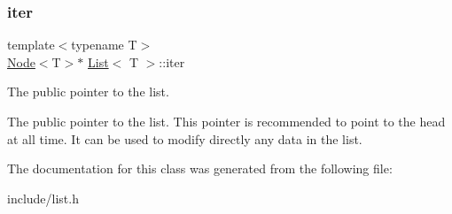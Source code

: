 \subsubsection{\texorpdfstring{iter}{iter}}
{\footnotesize\ttfamily template$<$typename T$>$ \\
\hyperlink{structNode}{Node}$<$T$>$$\ast$ \hyperlink{classList}{List}$<$ T $>$\+::iter}



The public pointer to the list. 

The public pointer to the list. This pointer is recommended to point to the head at all time. It can be used to modify directly any data in the list. 

The documentation for this class was generated from the following file\+:\begin{DoxyCompactItemize}
\item 
include/list.\+h\end{DoxyCompactItemize}
